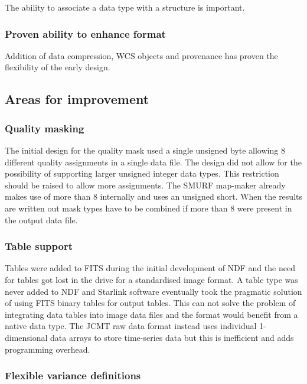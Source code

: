 \documentclass[final,authoryear,5p,times,twocolumn]{elsarticle}
\begin{document}
{The ability to associate a data type with a structure is important.

\subsubsection{Proven ability to enhance format}

Addition of data compression, WCS objects and provenance has proven
the flexibility of the early design.

\subsection{Areas for improvement}

\subsubsection{Quality masking}

The initial design for the quality mask used a single unsigned byte
allowing 8 different quality assignments in a single data file. The
design did not allow for the possibility of supporting larger unsigned
integer data types. This restriction should be raised to allow more
assignments. The SMURF map-maker
\citep[][ascl:1310.007]{2013MNRAS.430.2545C} already makes use of more
than 8 internally and uses an unsigned short. When the results are
written out mask types have to be combined if more than 8 were present
in the output data file.

\subsubsection{Table support}

Tables were added to FITS \citep{1988A&AS...73..365H} during the
initial development of NDF and the need for tables got lost in the
drive for a standardised image format. A table type was never added to
NDF and Starlink software eventually took the pragmatic solution of
using FITS binary tables \citep{1995A&AS..113..159C} for output
tables. This can not solve the problem of integrating data tables into
image data files and the format would benefit from a native data
type. The JCMT raw data format instead uses individual 1-dimensional
data arrays to store time-series data but this is inefficient and adds
programming overhead.

\subsubsection{Flexible variance definitions}

}
\end{document}
